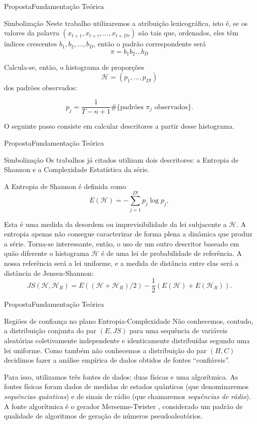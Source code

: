 \documentclass[10pt,xcolor={dvipsnames}]{beamer}
\begin{document}
\begin{frame}{Proposta}{Fundamentação Teórica}
\begin{block}{Simbolização}
	Neste trabalho utilizaremos a atribuição lexicográfica, isto é, se os valores da palavra $(x_{t+1},x_{t+\tau},\ldots, x_{t+D\tau})$ são tais que, ordenados, eles têm índices crescentes $b_1,b_2,\dots,b_D$, então o padrão correspondente será $$\pi=b_1b_2\dots b_D$$
	
	Calcula-se, então, o histograma de proporções $$\mathcal{H} =(p_1,\dots,p_{D!})$$ dos padrões observados:	
	\pause

		$$
		p_j = \frac{1}{T-n+1} \# \{
		\text{padrões } \pi_j \text{ observados}
		\}.
		$$
\pause

	O seguinte passo consiste em calcular descritores a partir desse histograma.
\end{block}
\end{frame}

\begin{frame}{Proposta}{Fundamentação Teórica}
\begin{block}{Simbolização}
Os trabalhos já citados utilizam dois descritores: a Entropia de Shannon e a Complexidade Estatística da série.

A Entropia de Shannon é definida como
$$
E(\mathcal H) = -\sum_{j=1}^{D!} p_j \log p_j,
$$

Esta é uma medida da desordem ou imprevisibilidade da lei subjacente a $\mathcal H$.
\pause
A entropia apenas não consegue caracterizar de forma plena a dinâmica que produz a série.
Torna-se interessante, então, o uso de um outro descritor baseado em quão diferente o histograma $\mathcal H$ é de uma lei de probabilidade de referência.
A nossa referência será a lei uniforme, e a medida de distância entre elas será a distância de Jensen-Shannon:
$$
JS(\mathcal H, \mathcal H_R) = E((\mathcal H+ \mathcal H_R)/2) -\frac{1}{2}(E(\mathcal H) + E(\mathcal H_R)).
$$
\end{block}
\end{frame}

\begin{frame}{Proposta}{Fundamentação Teórica}
	\begin{block}{Regiões de confiança no plano Entropia-Complexidade}
	Não conhecemos, contudo, a distribuição conjunta do par $(E,JS)$ para uma sequência de variáveis aleatórias coletivamente independente e identicamente distribuídas segundo uma lei uniforme.
	Como também não conhecemos a distribuição do par $(H,C)$ decidimos fazer a análise empírica de dados obtidos de fontes ``confiáveis''.
	\pause
	
	Para isso, utilizamos três fontes de dados: duas físicas e uma algorítmica.
	As fontes físicas foram dados de medidas de estados quânticos \cite{RNGVacuumStates} (que denominaremos \textit{sequências quânticas}) e de sinais de rádio \cite{RandomHostingAdvice} (que chamaremos \textit{sequências de rádio}).
	A fonte algorítmica é o gerador Mersenne-Twister \cite{Matsumoto98}, considerado um padrão de qualidade de algoritmos de geração de números pseudoaleatórios.
	\end{block}
\end{frame}
\end{document}
